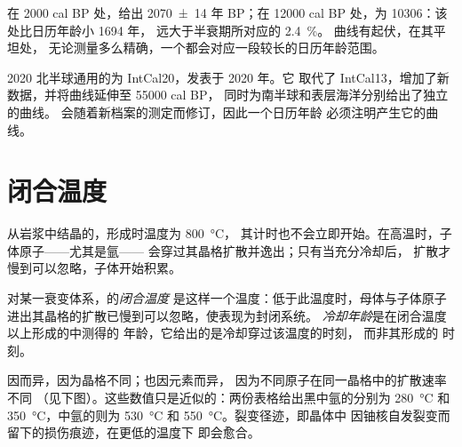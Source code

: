 在 \num{2000} cal BP 处，给出 \num[uncertainty-mode=separate]{2070 \pm 14} 年 BP；在
\num{12000} cal BP 处，为 \num{10306}：该处比日历年龄小 \num{1694} 年，
远大于半衰期所对应的 \qty{2.4}{\percent}。
曲线有起伏，在其平坦处，
无论测量多么精确，一个都会对应一段较长的日历年龄范围。

\begin{dated}{2020}
北半球通用的为 IntCal20，发表于 2020 年。它
取代了 IntCal13，增加了新数据，并将曲线延伸至 \num{55000} cal BP，
同时为南半球和表层海洋分别给出了独立的曲线。
会随着新档案的测定而修订，因此一个日历年龄
必须注明产生它的曲线。
\end{dated}

\section{闭合温度}\label{sec:b1:radiometric-methods:closure}

从岩浆中结晶的，形成时温度为 \qty{800}{\celsius}，
其计时也不会立即开始。在高温时，子体原子——尤其是氩——
会穿过其晶格扩散并逸出；只有当充分冷却后，
扩散才慢到可以忽略，子体开始积累。

\begin{definition}\label{def:b1:radiometric-methods:closure}
对某一衰变体系，的\emph{闭合温度}
是这样一个温度：低于此温度时，母体与子体原子
进出其晶格的扩散已慢到可以忽略，使表现为封闭系统。
\emph{冷却年龄}是在闭合温度以上形成的中测得的
年龄，它给出的是冷却穿过该温度的时刻，
而非其形成的
时刻。
\end{definition}

因而异，因为晶格不同；也因元素而异，
因为不同原子在同一晶格中的扩散速率不同
（见下图）。这些数值只是近似的：两份表格给出黑中氩的分别为 \qty{280}{\celsius} 和
\qty{350}{\celsius}，中氩的则为 \qty{530}{\celsius} 和
\qty{550}{\celsius}。裂变径迹，即晶体中
因铀核自发裂变而留下的损伤痕迹，在更低的温度下
即会愈合。

